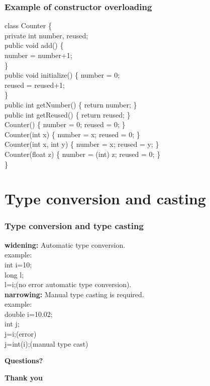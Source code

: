 \documentclass{beamer}
\begin{document}
\begin{frame}
\frametitle{Example of constructor overloading}
class Counter \{\\
private int number, reused;\\
public void add() \{\\
number = number+1;\\
\}\\
public void initialize() \{
number = 0;\\
reused = reused+1;\\
\}\\
public int getNumber() \{ return number; \}\\
public int getReused() \{ return reused; \}\\
Counter() \{ number = 0; reused = 0; \} \\
Counter(int x) \{ number = x; reused = 0; \} \\
Counter(int x, int y) \{ number = x; reused = y; \} \\
Counter(float z) \{ number = (int) z; reused = 0; \} \\
\}\\
\end{frame}
\section{Type conversion and casting}
\begin{frame}
    \frametitle{Type conversion and type casting}
    \textbf{widening:} Automatic type conversion.\\
        example: \\
                    int i=10;\\
                    long l;\\
                    l=i;(no error automatic type conversion).\\
    \textbf{narrowing:} Manual type casting is required.\\
    example: \\
                double i=10.02;\\
                int j;\\
                j=i;(error)\\
                j=int(i);(manual type cast)
\end{frame}
\begin{frame}
    \center \textbf{Questions?}
\end{frame}
\begin{frame}
    \center \textbf{Thank you}
\end{frame}
\end{document}
